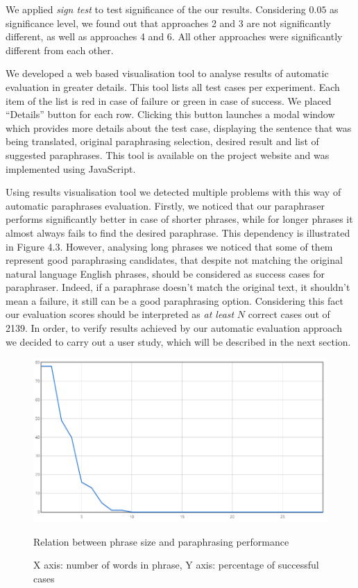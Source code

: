 We applied \emph{sign test} to test significance of the our results. Considering $0.05$ as significance level, we found out that approaches 2 and 3 are not significantly different, as well as approaches 4 and 6. All other approaches were significantly different from each other. 

We developed a web based visualisation tool to analyse results of automatic evaluation in greater details. This tool lists all test cases per experiment. Each item of the list is red in case of failure or green in case of success. We placed ``Details'' button for each row. Clicking this button launches a modal window which provides more details about the test case, displaying the sentence that was being translated, original paraphrasing selection, desired result and list of suggested paraphrases. This tool is available on the project website and was implemented using JavaScript. 

Using results visualisation tool we detected multiple problems with this way of automatic paraphrases evaluation. Firstly, we noticed that our paraphraser performs significantly better in case of shorter phrases, while for longer phrases it almost always fails to find the desired paraphrase. This dependency is illustrated in Figure 4.3. However, analysing long phrases we noticed that some of them represent good paraphrasing candidates, that despite not matching the original natural language English phrases, should be considered as success cases for paraphraser. Indeed, if a paraphrase doesn't match the original text, it shouldn't mean a failure, it still can be a good paraphrasing option. Considering this fact our evaluation scores should be interpreted as \emph{at least} $N$ correct cases out of 2139. In order, to verify results achieved by our automatic evaluation approach we decided to carry out a user study, which will be described in the next section.

\begin{figure}
 \centering 
 \includegraphics[scale=0.6]{g/phrase-size-chart.png}
 \caption{Relation between phrase size and paraphrasing performance}
 \caption*{X axis: number of words in phrase, Y axis: percentage of successful cases}
\end{figure}



